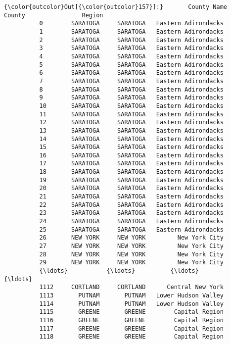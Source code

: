 \documentclass[11pt]{article}
\begin{document}
\begin{Verbatim}[commandchars=\\\{\}]
{\color{outcolor}Out[{\color{outcolor}157}]:}       County Name       County                Region
          0        SARATOGA     SARATOGA   Eastern Adirondacks
          1        SARATOGA     SARATOGA   Eastern Adirondacks
          2        SARATOGA     SARATOGA   Eastern Adirondacks
          3        SARATOGA     SARATOGA   Eastern Adirondacks
          4        SARATOGA     SARATOGA   Eastern Adirondacks
          5        SARATOGA     SARATOGA   Eastern Adirondacks
          6        SARATOGA     SARATOGA   Eastern Adirondacks
          7        SARATOGA     SARATOGA   Eastern Adirondacks
          8        SARATOGA     SARATOGA   Eastern Adirondacks
          9        SARATOGA     SARATOGA   Eastern Adirondacks
          10       SARATOGA     SARATOGA   Eastern Adirondacks
          11       SARATOGA     SARATOGA   Eastern Adirondacks
          12       SARATOGA     SARATOGA   Eastern Adirondacks
          13       SARATOGA     SARATOGA   Eastern Adirondacks
          14       SARATOGA     SARATOGA   Eastern Adirondacks
          15       SARATOGA     SARATOGA   Eastern Adirondacks
          16       SARATOGA     SARATOGA   Eastern Adirondacks
          17       SARATOGA     SARATOGA   Eastern Adirondacks
          18       SARATOGA     SARATOGA   Eastern Adirondacks
          19       SARATOGA     SARATOGA   Eastern Adirondacks
          20       SARATOGA     SARATOGA   Eastern Adirondacks
          21       SARATOGA     SARATOGA   Eastern Adirondacks
          22       SARATOGA     SARATOGA   Eastern Adirondacks
          23       SARATOGA     SARATOGA   Eastern Adirondacks
          24       SARATOGA     SARATOGA   Eastern Adirondacks
          25       SARATOGA     SARATOGA   Eastern Adirondacks
          26       NEW YORK     NEW YORK         New York City
          27       NEW YORK     NEW YORK         New York City
          28       NEW YORK     NEW YORK         New York City
          29       NEW YORK     NEW YORK         New York City
          {\ldots}           {\ldots}          {\ldots}                   {\ldots}
          1112     CORTLAND     CORTLAND      Central New York
          1113       PUTNAM       PUTNAM   Lower Hudson Valley
          1114       PUTNAM       PUTNAM   Lower Hudson Valley
          1115       GREENE       GREENE        Capital Region
          1116       GREENE       GREENE        Capital Region
          1117       GREENE       GREENE        Capital Region
          1118       GREENE       GREENE        Capital Region

\end{Verbatim}
\end{document}
